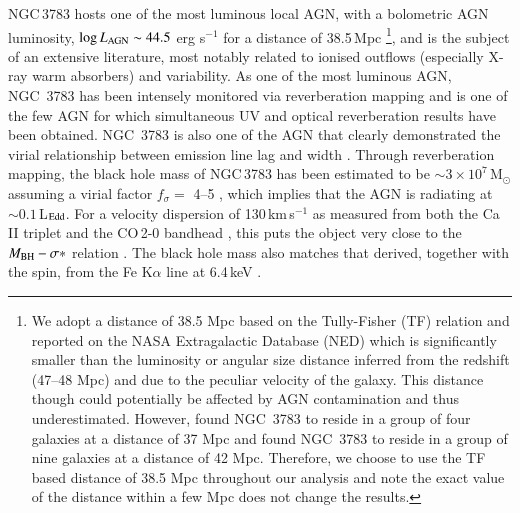 \documentclass[longauth,]{aa}
\begin{document}
NGC\,3783 hosts one of the most luminous local AGN, with a bolometric AGN luminosity, $\log{L_{\rm AGN}} \sim 44.5$ erg s$^{-1}$ for a distance of 38.5\,Mpc \citep{Tully:1988aa,Davies:2015uq}\footnote{We adopt a distance of 38.5 Mpc based on the Tully-Fisher (TF) relation and reported on the NASA Extragalactic Database (NED) which is significantly smaller than the luminosity or angular size distance inferred from the redshift (47--48 Mpc) and due to the peculiar velocity of the galaxy. This distance though could potentially be affected by AGN contamination and thus underestimated. However, \citet{Crook:2007aa} found NGC~3783 to reside in a group of four galaxies at a distance of 37 Mpc and \citet{Kourkchi:2017aa} found NGC~3783 to reside in a group of nine galaxies at a distance of 42 Mpc. Therefore, we choose to use the TF based distance of 38.5 Mpc throughout our analysis and note the exact value of the distance within a few Mpc does not change the results.}, and is the subject of an extensive literature, most notably related to ionised outflows (especially X-ray warm absorbers) and variability.
As one of the most luminous AGN, NGC~3783 has been intensely monitored via reverberation mapping and is one of the few AGN 
for which simultaneous UV \citep{Reichert:1994aa} and optical \citep{Stirpe:1994aa} reverberation results have been obtained. NGC~3783 is also one of the AGN that clearly demonstrated the virial relationship between emission line lag and width \citep{Onken:2002aa}. Through reverberation mapping, the black hole mass of NGC\,3783 has been estimated to be $\sim3\times10^7$\,M$_\odot$ assuming a virial factor $f_\sigma =$ 4--5 \citep{Peterson:2004aa,Bentz:2015aa}, which implies that the AGN is radiating at $\sim0.1$\,L$_{\rm Edd}$.
For a velocity dispersion of 130\,km\,s$^{-1}$ as measured from both the Ca\,II triplet and the CO\,2-0 bandhead \citep{Caglar:2020aa}, this puts the object very close to the $M_{\rm BH}-\sigma*$ relation \citep{Ferrarese:2000gf,Gebhardt:2000xy,Ferrarese:2001aa,Nelson:2004aa,Onken:2004aa,Gultekin:2009ul,McConnell:2013fk}.
The black hole mass also matches that derived, together with the spin, from the Fe K$\alpha$ line at 6.4\,keV \citep{brenneman11,capellupo17}.
\end{document}

